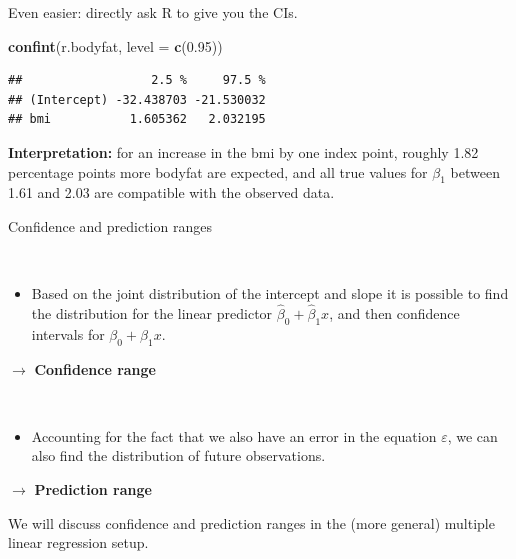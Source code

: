 \documentclass[10pt,ignorenonframetext,]{beamer}
\newenvironment{Shaded}{\begin{snugshade}}{\end{snugshade}}
\newcommand{\KeywordTok}[1]{\textcolor[rgb]{0.13,0.29,0.53}{\textbf{#1}}}
\newcommand{\DataTypeTok}[1]{\textcolor[rgb]{0.13,0.29,0.53}{#1}}
\newcommand{\FloatTok}[1]{\textcolor[rgb]{0.00,0.00,0.81}{#1}}
\newcommand{\NormalTok}[1]{#1}
\providecommand{\tightlist}{%
  \setlength{\itemsep}{0pt}\setlength{\parskip}{0pt}}
\begin{document}
\begin{frame}[fragile]

Even easier: directly ask R to give you the CIs.

\scriptsize

\begin{Shaded}
\begin{Highlighting}[]
\KeywordTok{confint}\NormalTok{(r.bodyfat, }\DataTypeTok{level =} \KeywordTok{c}\NormalTok{(}\FloatTok{0.95}\NormalTok{))}
\end{Highlighting}
\end{Shaded}

\begin{verbatim}
##                  2.5 %     97.5 %
## (Intercept) -32.438703 -21.530032
## bmi           1.605362   2.032195
\end{verbatim}

\normalsize

\textbf{Interpretation:} for an increase in the bmi by one index point,
roughly 1.82 percentage points more bodyfat are expected, and all true
values for \(\beta_1\) between 1.61 and 2.03 are compatible with the
observed data.

\end{frame}

\begin{frame}

\begin{block}{Confidence and prediction ranges}

\(~\)

\begin{itemize}
\tightlist
\item
  Based on the joint distribution of the intercept and slope it is
  possible to find the distribution for the linear predictor
  \(\hat{\beta}_0+\hat{\beta}_1 x\), and then confidence intervals for
  \(\beta_0+\beta_1 x\).
\end{itemize}

\hspace{6mm} \(\rightarrow\) \textbf{Confidence range}

\(~\)

\begin{itemize}
\tightlist
\item
  Accounting for the fact that we also have an error in the equation
  \(\varepsilon\), we can also find the distribution of future
  observations.
\end{itemize}

\hspace{6mm} \(\rightarrow\) \textbf{Prediction range}

\vspace{10mm} We will discuss confidence and prediction ranges in the
(more general) multiple linear regression setup.

\end{block}

\end{frame}
\end{document}

